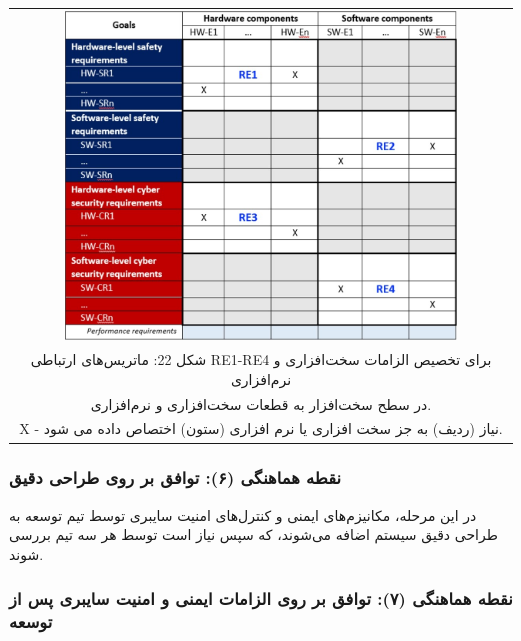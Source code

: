 \documentclass[a4paper,10pt]{article}
\begin{document}
                \begin{table}
            
                    \centering
                    \begin{tabular}{ c }
                        
                        \includegraphics[width=0.8\textwidth]{Image/fig22.jpg} \\
        
                        شکل 22: ماتریس‌های ارتباطی RE1-RE4 برای تخصیص الزامات سخت‌افزاری و نرم‌افزاری\\
                        
                        در سطح سخت‌افزار به قطعات سخت‌افزاری و نرم‌افزاری.\\

                        X - نیاز (ردیف) به جز سخت افزاری یا نرم افزاری (ستون) اختصاص داده می شود.
    
                    \end{tabular}
        
                \end{table}

            \subsubsection{نقطه هماهنگی (۶): توافق بر روی طراحی دقیق}

                در این مرحله، مکانیزم‌های ایمنی و کنترل‌های امنیت سایبری توسط تیم توسعه به طراحی دقیق سیستم اضافه می‌شوند، که سپس نیاز است توسط هر سه تیم بررسی شوند.

            \subsubsection{نقطه هماهنگی (۷): توافق بر روی الزامات ایمنی و امنیت سایبری پس از توسعه}
\end{document}
